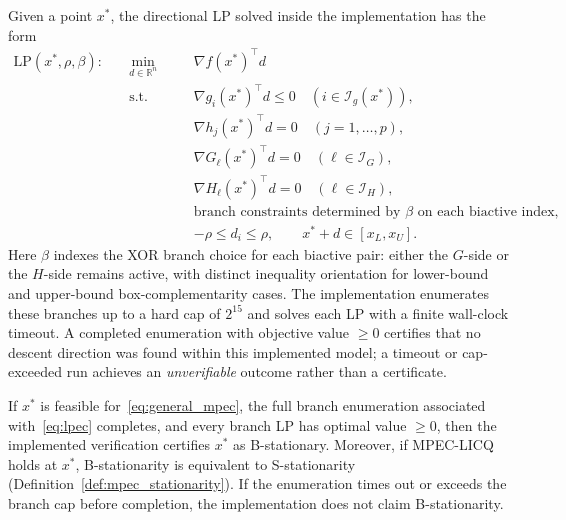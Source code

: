 \begin{definition}
Given a point $x^*$, the directional LP solved inside the
implementation has the form
\begin{equation}
\begin{aligned}
  \text{LP}(x^*,\rho,\beta): \quad & \min_{d \in \mathbb{R}^n} \quad && \nabla f(x^*)^\top d \\
  & \text{s.t.} \quad && \nabla g_i(x^*)^\top d \leq 0 \quad (i \in \mathcal{I}_g(x^*)), \\
  & && \nabla h_j(x^*)^\top d = 0 \quad (j = 1, \ldots, p), \\
  & && \nabla G_\ell(x^*)^\top d = 0 \quad (\ell \in \mathcal{I}_G), \\
  & && \nabla H_\ell(x^*)^\top d = 0 \quad (\ell \in \mathcal{I}_H), \\
  & && \text{branch constraints determined by } \beta \text{ on each biactive index}, \\
  & && -\rho \le d_i \le \rho,\qquad x^* + d \in [x_L, x_U].
\end{aligned}
\label{eq:lpec}
\end{equation}
Here $\beta$ indexes the XOR branch choice for each biactive pair:
either the $G$-side or the $H$-side remains active, with distinct
inequality orientation for lower-bound and upper-bound
box-complementarity cases. The implementation enumerates these branches
up to a hard cap of $2^{15}$ and solves each LP with a finite wall-clock
timeout. A completed enumeration with objective value $\ge 0$ certifies
that no descent direction was found within this implemented model; a
timeout or cap-exceeded run achieves an \emph{unverifiable} outcome rather
than a certificate.
\end{definition}

\begin{proposition}
\label{thm:lpec_bstat}
If $x^*$ is feasible for~\eqref{eq:general_mpec}, the full branch
enumeration associated with~\eqref{eq:lpec} completes, and every branch
LP has optimal value $\geq 0$, then the implemented verification certifies
$x^*$ as B-stationary. Moreover, if MPEC-LICQ holds at $x^*$,
B-stationarity is equivalent to S-stationarity
(Definition~\ref{def:mpec_stationarity}). If the enumeration times out
or exceeds the branch cap before completion, the implementation does not
claim B-stationarity.
\end{proposition}


